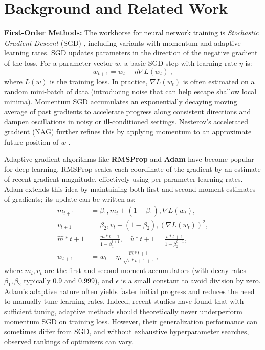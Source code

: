 \documentclass[12pt]{article}
\begin{document}
\section{Background and Related Work} \label{background}
\textbf{First-Order Methods:} The workhorse for neural network training is \emph{Stochastic Gradient Descent} (SGD) \cite{Robbins1951SGD}, including variants with momentum \cite{Polyak1964Momentum} and adaptive learning rates. SGD updates parameters in the direction of the negative gradient of the loss. For a parameter vector $w$, a basic SGD step with learning rate $\eta$ is:
\begin{equation}\label{eq:sgd-update}
w_{t+1} = w_t - \eta \nabla L(w_t)~,
\end{equation}
where $L(w)$ is the training loss. In practice, $\nabla L(w_t)$ is often estimated on a random mini-batch of data (introducing noise that can help escape shallow local minima). Momentum SGD accumulates an exponentially decaying moving average of past gradients to accelerate progress along consistent directions and dampen oscillations in noisy or ill-conditioned settings. Nesterov's accelerated gradient (NAG) further refines this by applying momentum to an approximate future position of $w$ \cite{Nesterov1983}.

Adaptive gradient algorithms like \textbf{RMSProp} and \textbf{Adam} have become popular for deep learning. RMSProp \cite{Hinton2012RMSprop} scales each coordinate of the gradient by an estimate of recent gradient magnitude, effectively using per-parameter learning rates. Adam \cite{Kingma2015Adam} extends this idea by maintaining both first and second moment estimates of gradients; its update can be written as:
\begin{equation}\label{eq:adam-update}
\begin{aligned}
m_{t+1} &= \beta_1, m_t + (1-\beta_1), \nabla L(w_t),\\
v_{t+1} &= \beta_2, v_t + (1-\beta_2), (\nabla L(w_t))^2,\\
\hat{m}*{t+1} &= \frac{m*{t+1}}{1-\beta_1^{t+1}}, \quad
\hat{v}*{t+1} = \frac{v*{t+1}}{1-\beta_2^{t+1}},\\
w_{t+1} &= w_t - \eta, \frac{\hat{m}*{t+1}}{\sqrt{\hat{v}*{t+1}} + \epsilon}~,
\end{aligned}
\end{equation}
where $m_t, v_t$ are the first and second moment accumulators (with decay rates $\beta_1, \beta_2$ typically 0.9 and 0.999), and $\epsilon$ is a small constant to avoid division by zero. Adam’s adaptive nature often yields faster initial progress and reduces the need to manually tune learning rates. Indeed, recent studies have found that with sufficient tuning, adaptive methods should theoretically never underperform momentum SGD on training loss. However, their generalization performance can sometimes differ from SGD, and without exhaustive hyperparameter searches, observed rankings of optimizers can vary.
\end{document}
